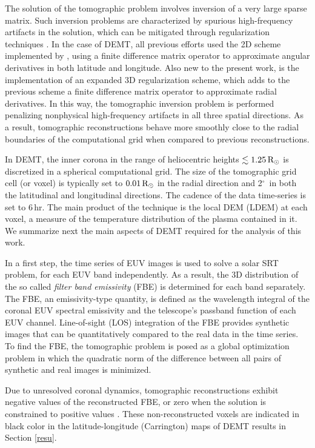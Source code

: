 \documentclass[namedreferences]{solarphysics}
\renewcommand{\deg}{$^\circ$}
\newcommand{\mrsun}{{\rm R_\odot}}
\begin{document}
\begin{article}
{The solution of the tomographic problem involves {inversion of} a very large sparse matrix. Such inversion problems are characterized by spurious {high-fre\-quen\-cy} artifacts in the solution, which can be mitigated through {regularization} techniques \citep{frazin_2000}. In the case of DEMT, all previous efforts used the 2D scheme implemented by \citet{frazin_2009}, using a finite difference matrix operator to approximate angular derivatives in both latitude and longitude. Also new to the present work, is the implementation of an expanded 3D regularization scheme, which adds to the previous scheme a finite difference matrix operator to approximate radial derivatives. In this way, the tomographic inversion problem is performed penalizing nonphysical high-frequency artifacts in all three spatial directions. As a result, tomographic reconstructions behave more smoothly close to the radial boundaries of the computational grid {when compared to previous reconstructions.}}

{In DEMT, the inner corona in the range of heliocentric heights $\lesssim 1.25\,\mrsun$ is discretized in a spherical computational grid. The size of the tomographic grid cell (or voxel) is typically set to $0.01\,\mrsun$ in the radial direction and 2\deg\ in both the latitudinal and longitudinal directions. The cadence of the data time-series is set to 6\,hr. The main product of the technique is the local DEM (LDEM) at each voxel, a measure of the temperature distribution of the plasma contained in it. We summarize next the main aspects of DEMT required for the analysis of this work.}

In a first step, the time series of EUV images is used to solve a solar SRT problem, for each EUV band independently. As a result, the 3D distribution of the so called \emph{filter band emissivity} (FBE) is determined for each band separately. The FBE, {an emissivity-type quantity}, is defined as the wavelength integral of the coronal EUV spectral emissivity and the telescope's passband function of each EUV channel. Line-of-sight (LOS) integration of the FBE provides synthetic images that can be quantitatively compared to the real data in the time series. To find the FBE, the tomographic problem is posed as a global optimization problem in which the quadratic norm of the difference between all {pairs of synthetic and real images is minimized.}

Due to unresolved coronal dynamics, tomographic reconstructions exhibit negative values of the reconstructed FBE, or zero when the solution is constrained to positive values \citep{frazin_2000,frazin_2009}. These non-reconstructed voxels are indicated {in black color in the latitude-longitude (Carrington) maps of DEMT} results in Section \ref{resu}.


\end{article}
\end{document}
